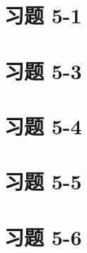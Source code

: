 \documentclass[UTF8,12pt,a4paper]{ctexart} %
\begin{document}
\section*{习题 5-1}



\section*{习题 5-3}



\section*{习题 5-4}



\section*{习题 5-5}



\section*{习题 5-6}


\end{document}
